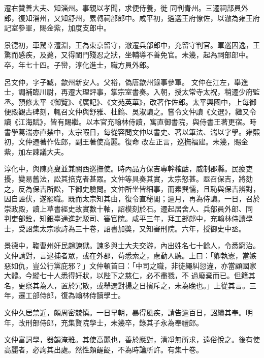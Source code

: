 \begin{pinyinscope}
 遷右贊善大夫、知淄州。事親以孝聞，求便侍養，徙
 同判青州。三遷祠部員外郎，復知淄州，又知舒州，累轉祠部郎中。咸平初，遴選王府僚佐，以澈為雍王府記室參軍，賜金紫，加度支郎中。



 景德初，車駕幸澶淵，王為東京留守，澈遷兵部郎中，充留守判官。軍巡囚逸，王驚而感疾，及薨，又得閨門殘忍之狀，坐輔導不善免官。未幾，起為祠部郎中。卒，年七十四。子巒，淳化進士，職方員外郎。



 呂文仲，字子臧，歙州新安人。父裕，偽唐歙州錄事參軍。
 文仲在江左，舉進士，調補臨川尉，再遷大理評事，掌宗室書奏。入朝，授太常寺太祝，稍遷少府監丞。預修太平《御覽》、《廣記》、《文苑英華》，改著作佐郎。太平興國中，上每御便殿觀古碑刻，輒召文仲與舒雅、杜鎬、吳淑讀之。嘗令文仲讀《文選》，繼又令讀《江海賦》，皆有賜繼。以本官充翰林侍讀，寓直御書院，與侍書王著更宿。時書學葛湍亦直禁中，太宗暇日，每從容問文仲以書史、著以筆法、湍以字學。雍熙初，文仲遷著作佐郎，副王著使高麗。復命
 改左正言，巡撫福建。未幾，賜金紫，加左諫議大夫。



 淳化中，與陳堯叟並兼關西巡撫使。時內品方保吉專幹榷酤，威制郡縣。民疲吏擾，變易舊法，訟其掊克者甚眾。文仲等具奏其實，太宗怒甚。亟召保吉，將劾之，反為保吉所訟，下御史驗問。文仲所坐皆細事，而素巽懦，且恥與保吉辨對，因自誣伏，遂罷職。既而太宗知其由，復令直秘閣；逾月，再為侍讀。一日，召於崇政殿，讀上草書經史故實數十軸，詔模刻於石。遷起居舍人、兵部員外郎、同
 判吏部銓，知銀臺通進封駁司、審官院。咸平三年，拜工部郎中，充翰林侍讀學士，受詔集太宗歌詩為三十卷，詔書加獎，又知審刑院。六年，授御史中丞。



 景德中，鞫曹州奸民趙諫獄。諫多與士大夫交游，內出姓名七十餘人，令悉窮治。文仲請對，言逮捕者眾，或在外郡，茍悉索之，慮動人聽。上曰：「卿執憲，當嫉惡如仇，豈公行黨庇邪？」文仲頓首曰：「中司之職，非徒繩糾愆違，亦當顧國家大體。今縱七十人悉得奸狀，以陛下之慈仁，必不盡戮，不
 過廢棄而已。但籍其名，更察其為人，置於冗散，或舉選對揚之日擯斥之，未為晚也。」上從其言。三年，遷工部侍郎，復為翰林侍讀學士。



 文仲久居禁近，頗周密兢慎。一日早朝，暴得風疾，請告逾百日，詔續其奉。明年，改刑部侍郎，充集賢院學士，未幾卒，錄其子永為奉禮郎。



 文仲富詞學，器韻淹雅。其使高麗也，善於應對，清凈無所求，遠俗悅之。後有使高麗者，必詢其出處。然性頗齷齪，不為時論所許。有集十卷。




\end{pinyinscope}
